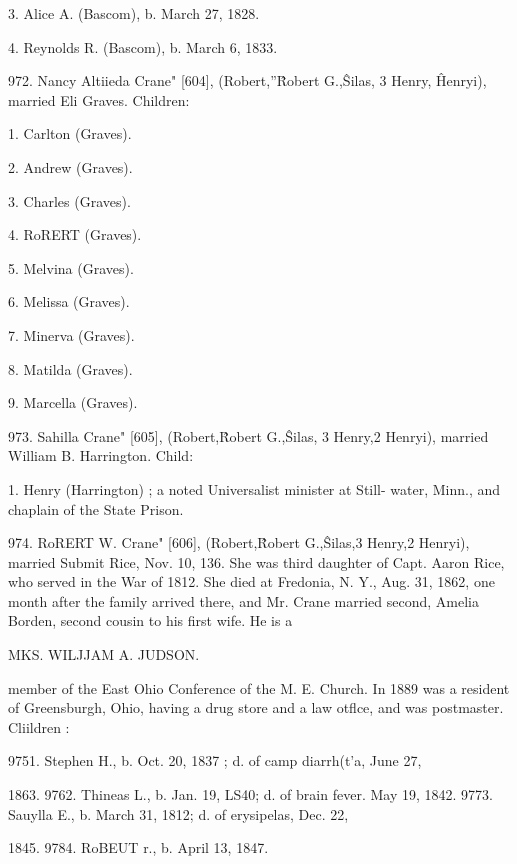 3. Alice A. (Bascom), b. March 27, 1828. 

4. Reynolds R. (Bascom), b. March 6, 1833. 

972. Nancy Altiieda Crane" [604], (Robert,''\^ Robert G.,\^ 
Silas, 3 Henry, \^ Henryi), married Eli Graves. Children: 

1. Carlton (Graves). 

2. Andrew (Graves). 

3. Charles (Graves). 

4. RoRERT (Graves). 

5. Melvina (Graves). 

6. Melissa (Graves). 

7. Minerva (Graves). 

8. Matilda (Graves). 

9. Marcella (Graves). 

973. Sahilla Crane" [605], (Robert,\^ Robert G.,\^ Silas, 3 
Henry,2 Henryi), married William B. Harrington. Child: 

1. Henry (Harrington) ; a noted Universalist minister at Still- 
water, Minn., and chaplain of the State Prison. 

974. RoRERT W. Crane" [606], (Robert,\^ Robert G.,\^ Silas,3 
Henry,2 Henryi), married Submit Rice, Nov. 10, 136. She 
was third daughter of Capt. Aaron Rice, who served in the War 
of 1812. She died at Fredonia, N. Y., Aug. 31, 1862, one 
month after the family arrived there, and Mr. Crane married 
second, Amelia Borden, second cousin to his first wife. He is a 




MKS. WILJJAM A. JUDSON. 




member of the East Ohio Conference of the M. E. Church. In 
1889 was a resident of Greensburgh, Ohio, having a drug store 
and a law otflce, and was postmaster. Cliildren : 

9751. Stephen H., b. Oct. 20, 1837 ; d. of camp diarrh(t'a, June 27, 

1863. 
9762. Thineas L., b. Jan. 19, LS40; d. of brain fever. May 19, 1842. 
9773. Sauylla E., b. March 31, 1812; d. of erysipelas, Dec. 22, 

1845. 
9784. RoBEUT r., b. April 13, 1847. 

